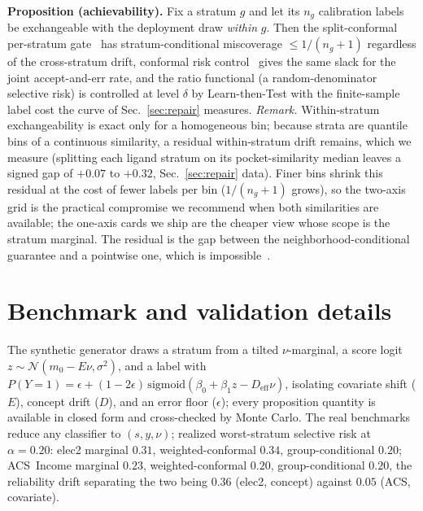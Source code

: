 \documentclass[10pt]{article}
\begin{document}
\textbf{Proposition (achievability).} Fix a stratum $g$ and let its $n_g$ calibration labels be exchangeable
with the deployment draw \emph{within} $g$. Then the split-conformal per-stratum gate~\citep{vovk2005} has
stratum-conditional miscoverage $\le 1/(n_g{+}1)$ regardless of the cross-stratum drift, conformal risk
control~\citep{angelopoulos2024crc} gives the same slack for the joint accept-and-err rate, and the ratio
functional (a random-denominator selective risk) is controlled at level $\delta$ by Learn-then-Test with the
finite-sample label cost the curve of Sec.~\ref{sec:repair} measures. \emph{Remark.} Within-stratum
exchangeability is exact only for a homogeneous bin; because strata are quantile bins of a continuous
similarity, a residual within-stratum drift remains, which we measure (splitting each ligand stratum on its
pocket-similarity median leaves a signed gap of $+0.07$ to $+0.32$, Sec.~\ref{sec:repair} data). Finer bins
shrink this residual at the cost of fewer labels per bin ($1/(n_g{+}1)$ grows), so the two-axis grid is the
practical compromise we recommend when both similarities are available; the one-axis cards we ship are the
cheaper view whose scope is the stratum marginal. The residual is the gap between the neighborhood-conditional
guarantee and a pointwise one, which is impossible~\citep{barber2021limits}.

\section{Benchmark and validation details}\label{app:bench}
\small The synthetic generator draws a stratum from a tilted $\nu$-marginal, a score logit
$z\sim\mathcal{N}(m_0-E\nu,\sigma^2)$, and a label with
$P(Y{=}1)=\epsilon+(1-2\epsilon)\,\mathrm{sigmoid}(\beta_0+\beta_1 z-D_{\mathrm{eff}}\nu)$, isolating
covariate shift ($E$), concept drift ($D$), and an error floor ($\epsilon$); every proposition quantity is
available in closed form and cross-checked by Monte Carlo. The real benchmarks reduce any classifier to
$(s,y,\nu)$; realized worst-stratum selective risk at $\alpha=0.20$: elec2 marginal $0.31$,
weighted-conformal $0.34$, group-conditional $0.20$; ACS~Income marginal $0.23$, weighted-conformal $0.20$,
group-conditional $0.20$, the reliability drift separating the two being $0.36$ (elec2, concept) against
$0.05$ (ACS, covariate).
\end{document}

